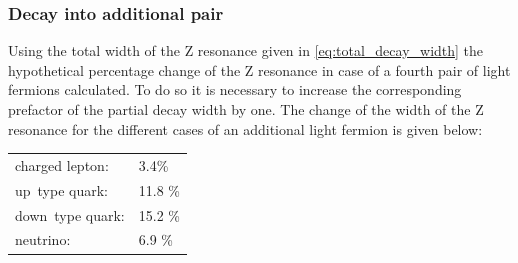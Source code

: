 \documentclass[11pt, a4paper]{article}
\numberwithin{equation}{section}
\begin{document}
\subsubsection{Decay into additional pair}
Using the total width of the Z resonance given in \eqref{eq:total_decay_width} the hypothetical percentage change of the Z resonance in case of a fourth pair of light fermions calculated.
To do so it is necessary to increase the corresponding prefactor of the partial decay width by one.
The change of the width of the Z resonance for the different cases of an additional light fermion is given below:
\begin{table}[h]
\centering
\begin{tabular}{ll}
	charged lepton: & 3.4\% \\
	up~type quark: & 11.8 \% \\
	down~type quark: & 15.2 \% \\
	neutrino: & 6.9 \%
\end{tabular}
\end{table}
\end{document}
